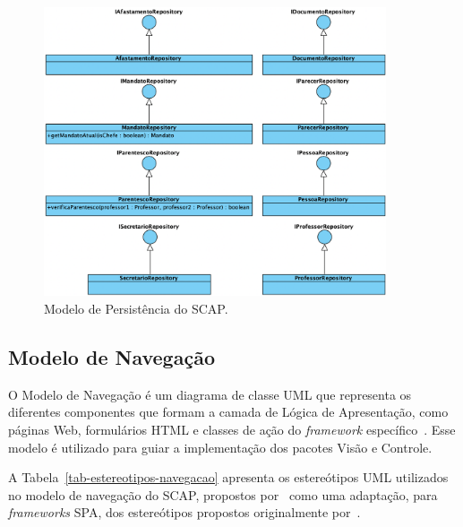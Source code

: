\begin{figure}[h!]
    \centering
    \includegraphics[width=0.9\textwidth]{figuras/fig-modelo-persist.png}
    \caption{Modelo de Persistência do SCAP.}
    \label{fig-modelo-persist}
\end{figure}

\FloatBarrier



\subsection{Modelo de Navegação}
\label{subsec-frameweb-navegacao}

O Modelo de Navegação é um diagrama de classe UML que representa os diferentes componentes que
formam a camada de Lógica de Apresentação, como páginas Web, formulários HTML e classes de ação do \textit{framework} específico~\cite{souza:2007}. 
Esse modelo é utilizado para guiar a implementação dos pacotes Visão e Controle.

A Tabela~\ref{tab-estereotipos-navegacao} apresenta os estereótipos UML utilizados no modelo de navegação do SCAP,
propostos por~ como uma adaptação, para \textit{frameworks} SPA,
dos estereótipos propostos originalmente por~.

